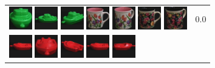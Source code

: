 \begin{figure}[tbp]
\begin{center}
\begin{tabular}{m{11cm} | m{3cm} |}
\includegraphics[width=1cm]{coil/beeld-56.eps}
\includegraphics[width=1cm]{coil/beeld-54.eps}
\includegraphics[width=1cm]{coil/beeld-57.eps}
\includegraphics[width=1cm]{coil/beeld-6.eps}
\includegraphics[width=1cm]{coil/beeld-9.eps}
\includegraphics[width=1cm]{coil/beeld-60.eps}
\includegraphics[width=1cm]{coil/beeld-63.eps}
& {\scriptsize 0.0}
\\
\includegraphics[width=1cm]{coil/beeld-18.eps}
\includegraphics[width=1cm]{coil/beeld-20.eps}
\includegraphics[width=1cm]{coil/beeld-22.eps}
\includegraphics[width=1cm]{coil/beeld-18.eps}
\includegraphics[width=1cm]{coil/beeld-19.eps}

\end{tabular}
\end{center}
\end{figure}
